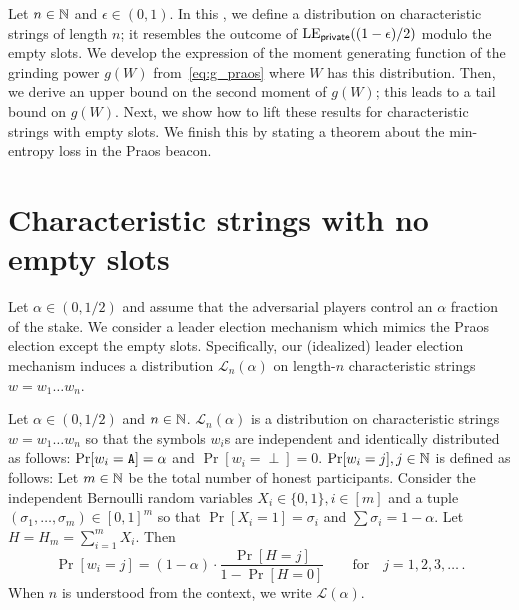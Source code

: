 

Let $n \in \mathbb{N}$ and $\epsilon \in (0,1)$.
In this \Section,
we define a distribution on characteristic strings of length $n$; 
it resembles the outcome of $\mathrm{LE}_\mathsf{private}((1-\epsilon)/2)$ 
modulo the empty slots. 
We develop the expression of the moment generating function of the 
grinding power $g(W)$ from~\eqref{eq:g_praos} 
where $W$ has this distribution. 
Then, we derive an upper bound on the second moment of $g(W)$;
this leads to a  tail bound on $g(W)$.
Next, we show how to lift these results 
for characteristic strings with empty slots.
We finish this \Section by stating a theorem about the min-entropy loss in the Praos beacon. 




\section{Characteristic strings with no empty slots}\label{sec:Lalpha-praos}

Let $\alpha \in (0, 1/2)$ 
and assume that the adversarial players control an $\alpha$ 
fraction of the stake. 
We consider a leader election mechanism 
which mimics the Praos election except the empty slots. 
Specifically, 
our (idealized) leader election mechanism 
induces 
a distribution $\mathcal{L}_n(\alpha)$ 
on length-$n$ characteristic strings $w = w_1 \ldots w_n$. 

\begin{definition}\label{def:dist-L-alpha-praos}
  Let $\alpha \in (0,1/2)$ and $n \in \mathbb{N}$. 
  $\mathcal{L}_n(\alpha)$ is a distribution on characteristic strings 
  $w = w_1 \ldots w_n$ so that 
  the symbols $w_i$s are independent and identically distributed as follows: 
  $\Pr[w_i = \mathtt{A}] = \alpha$ and $\Pr[w_i = \perp] = 0$.
  $\Pr[w_i = j], j \in \mathbb{N}$ is defined as follows: 
  Let $m \in \mathbb{N}$ be the total number of honest participants. 
  Consider the independent Bernoulli random variables $X_i \in \{0, 1\}, i \in [m]$ 
  and a tuple $(\sigma_1, \ldots, \sigma_m) \in [0,1]^m$ 
  so that $\Pr[X_i = 1] = \sigma_i$ 
  and $\sum \sigma_i = 1 - \alpha$. 
  Let $H = H_m = \sum_{i =1}^m X_i$. 
  Then 
  $$
    \Pr[w_i = j] = (1-\alpha)\cdot
      \frac{\Pr[H = j]}{1 - \Pr[H = 0]}
      \qquad \text{for}\quad j = 1,2,3,\ldots
      \,.
  $$
  When $n$ is understood from the context, 
  we write $\mathcal{L}(\alpha)$. 
\end{definition}


